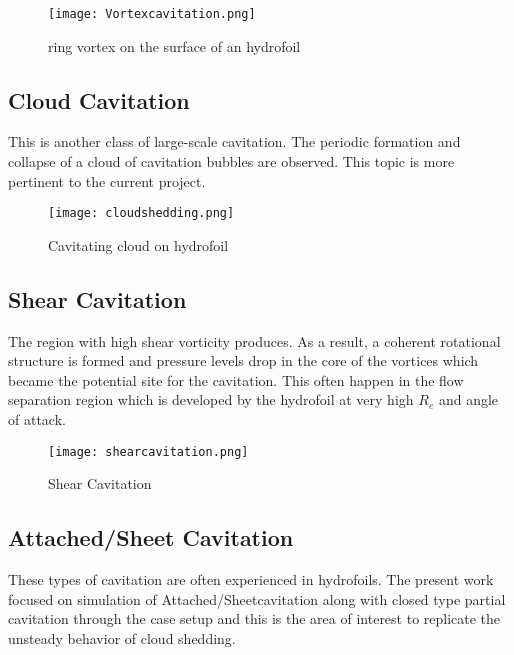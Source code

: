 \begin{figure}[H]
 \centering
 \texttt{[image: Vortexcavitation.png]}
 \caption{ring vortex on the surface of an hydrofoil \cite{FundamentalsofCavitation.2004}}
  \label{fig:fig7}
\end{figure}
\subsection{Cloud Cavitation}

This is another class of large-scale cavitation. The periodic
formation and collapse of a cloud of cavitation bubbles are
observed. This topic is more pertinent to the current project.

\begin{figure}[H]
 \centering
 \texttt{[image: cloudshedding.png]}
 \caption{Cavitating cloud on hydrofoil \cite{FundamentalsofCavitation.2004}}
 \label{fig:fig8}
\end{figure} 

\subsection{Shear Cavitation}
The region with high shear vorticity produces.  As a result, a
coherent rotational structure is formed and pressure levels drop in
the core of the vortices which became the potential site for the
cavitation. This often happen in the flow separation region which is
developed by the hydrofoil at very high $R_e$ and angle of attack.

\begin{figure}[H]
 \centering
 \texttt{[image: shearcavitation.png]}
 \caption{Shear Cavitation \cite{FundamentalsofCavitation.2004}}
  \label{fig:fig9}
\end{figure}

\subsection{Attached/Sheet Cavitation}
These types of cavitation are often experienced in hydrofoils. The present
work focused on simulation of Attached/Sheetcavitation along with closed type partial cavitation through the case
setup and this is the area of interest to replicate the unsteady
behavior of cloud shedding.\\

